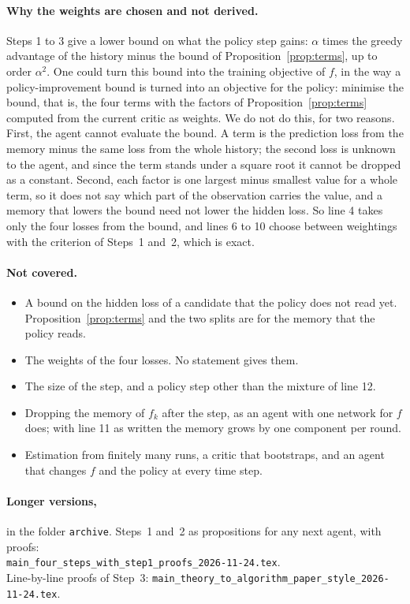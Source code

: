 \documentclass[11pt]{article}
\theoremstyle{definition}
\begin{document}
\paragraph{Why the weights are chosen and not derived.} Steps 1 to 3 give a lower bound on what the policy step gains: $\alpha$ times the greedy advantage of the history minus the bound of Proposition~\ref{prop:terms}, up to order $\alpha^2$. One could turn this bound into the training objective of $f$, in the way a policy-improvement bound is turned into an objective for the policy: minimise the bound, that is, the four terms with the factors of Proposition~\ref{prop:terms} computed from the current critic as weights. We do not do this, for two reasons. First, the agent cannot evaluate the bound. A term is the prediction loss from the memory minus the same loss from the whole history; the second loss is unknown to the agent, and since the term stands under a square root it cannot be dropped as a constant. Second, each factor is one largest minus smallest value for a whole term, so it does not say which part of the observation carries the value, and a memory that lowers the bound need not lower the hidden loss. So line 4 takes only the four losses from the bound, and lines 6 to 10 choose between weightings with the criterion of Steps~1 and~2, which is exact.

\paragraph{Not covered.}
\begin{itemize}\setlength{\itemsep}{0pt}
\item A bound on the hidden loss of a candidate that the policy does not read yet. Proposition~\ref{prop:terms} and the two splits are for the memory that the policy reads.
\item The weights of the four losses. No statement gives them.
\item The size of the step, and a policy step other than the mixture of line 12.
\item Dropping the memory of $f_k$ after the step, as an agent with one network for $f$ does; with line 11 as written the memory grows by one component per round.
\item Estimation from finitely many runs, a critic that bootstraps, and an agent that changes $f$ and the policy at every time step.
\end{itemize}

\paragraph{Longer versions,} in the folder \texttt{archive}. Steps~1 and~2 as propositions for any next agent, with proofs:\\ {\small\texttt{main\_four\_steps\_with\_step1\_proofs\_2026-11-24.tex}}.\\ Line-by-line proofs of Step~3: {\small\texttt{main\_theory\_to\_algorithm\_paper\_style\_2026-11-24.tex}}.
\end{document}

